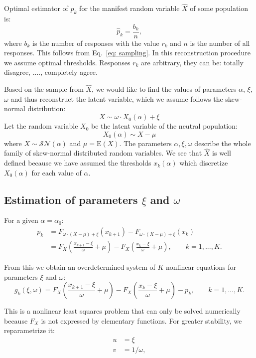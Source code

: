 \documentclass[10pt]{article}
\begin{document}
Optimal estimator of $p_{k}$ for the manifest random variable $\hat{X}$ of some population is:
\begin{equation}
\hat{p}_{k} = \frac{b_{k}}{n},
\end{equation}
where $b_{k}$ is the number of responses with the value $r_{k}$ and $n$ is the number of all responses. This follows from Eq.~\ref{eq: sampling}.
In this reconstruction procedure we assume optimal thresholds. Responses $r_{k}$ are arbitrary, they can be: totally disagree, ...., completely agree.

Based on the sample from $\hat{X}$, we would like to find the values of parameters $\alpha$, $\xi$, $\omega$ and thus reconstruct the latent variable, which we assume follows the skew-normal distribution:
\begin{equation}
X \sim \omega \cdot X_{0}(\alpha) + \xi
\end{equation}
Let the random variable $X_{0}$ be the latent variable of the neutral population:
\begin{equation}
X_{0}(\alpha) \sim X - \mu
\end{equation}
where $X \sim \mathcal{SN}(\alpha)$ and $\mu = \mathrm{E}(X)$. The parameters $\alpha, \xi, \omega$ describe the whole family of skew-normal distributed random variables. We see that $\hat{X}$ is well defined because we have assumed the thresholds $x_{k}(\alpha)$ which discretize $X_{0}(\alpha)$ for each value of $\alpha$.

\subsection{Estimation of parameters $\xi$ and $\omega$} 
For a given $\alpha = \alpha_{0}$:
\begin{align}
p_{k} &= 
F_{\omega \cdot (X - \mu) + \xi}(x_{k+1}) -
F_{\omega \cdot (X - \mu) + \xi}(x_{k}) \\
&= F_{X}(\frac{x_{k+1} - \xi}{\omega} + \mu) -
F_{X}(\frac{x_{k} - \xi}{\omega} + \mu), \qquad k = 1, ..., K.
\end{align}

From this we obtain an overdetermined system of $K$ nonlinear equations for parameters $\xi$ and $\omega$:
\begin{equation}
g_{k}(\xi, \omega) = 
F_{X}(\frac{x_{k+1} - \xi}{\omega} + \mu) -
F_{X}(\frac{x_{k} - \xi}{\omega} + \mu) - p_{k}, \qquad k = 1, ..., K.
\end{equation}

This is a nonlinear least squares problem that can only be solved numerically because $F_{X}$ is not expressed by elementary functions. For greater stability, we reparametrize it:
\begin{align}
u &= \xi \\
v &= 1/\omega,
\end{align}
\end{document}
